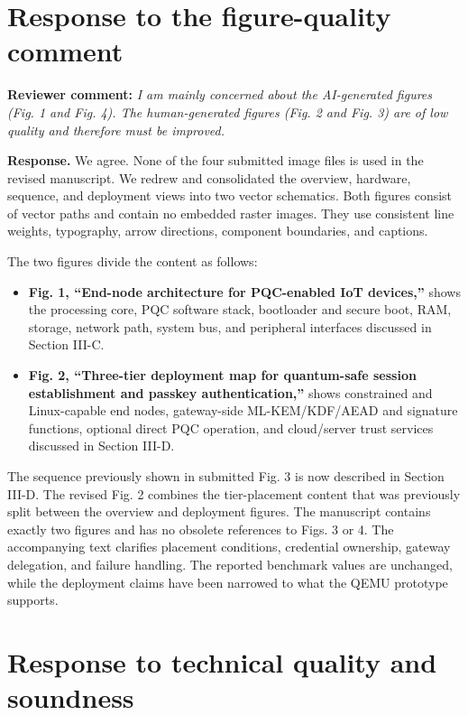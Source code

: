 \documentclass[10pt,letterpaper]{article}
\begin{document}
\section*{Response to the figure-quality comment}

\textcolor{reviewblue}{\textbf{Reviewer comment:}} \emph{I am mainly concerned about the AI-generated figures (Fig. 1 and Fig. 4). The human-generated figures (Fig. 2 and Fig. 3) are of low quality and therefore must be improved.}

\textbf{Response.} We agree. None of the four submitted image files is used in the revised manuscript. We redrew and consolidated the overview, hardware, sequence, and deployment views into two vector schematics. Both figures consist of vector paths and contain no embedded raster images. They use consistent line weights, typography, arrow directions, component boundaries, and captions.

The two figures divide the content as follows:

\begin{itemize}
  \item \textbf{Fig. 1, ``End-node architecture for PQC-enabled IoT devices,''} shows the processing core, PQC software stack, bootloader and secure boot, RAM, storage, network path, system bus, and peripheral interfaces discussed in Section III-C.
  \item \textbf{Fig. 2, ``Three-tier deployment map for quantum-safe session establishment and passkey authentication,''} shows constrained and Linux-capable end nodes, gateway-side ML-KEM/KDF/AEAD and signature functions, optional direct PQC operation, and cloud/server trust services discussed in Section III-D.
\end{itemize}

The sequence previously shown in submitted Fig. 3 is now described in Section III-D. The revised Fig. 2 combines the tier-placement content that was previously split between the overview and deployment figures. The manuscript contains exactly two figures and has no obsolete references to Figs. 3 or 4. The accompanying text clarifies placement conditions, credential ownership, gateway delegation, and failure handling. The reported benchmark values are unchanged, while the deployment claims have been narrowed to what the QEMU prototype supports.

\section*{Response to technical quality and soundness}
\end{document}

